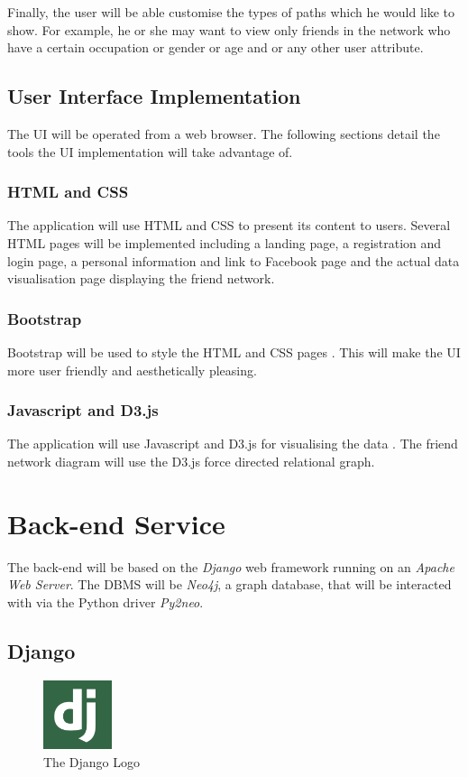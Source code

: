 \documentclass[10pt,onecolumn]{article}
\begin{document}
Finally, the user will be able customise the types of paths which he would like to show. For example, he or she may want to view only friends in the network who have a certain occupation or gender or age and or any other user attribute.

\subsection{User Interface Implementation}
The UI will be operated from a web browser. The following sections detail the tools the UI implementation will take advantage of.

\subsubsection{HTML and CSS}
The application will use HTML and CSS to present its content to users. Several HTML pages will be implemented including a landing page, a registration and login page, a personal information and link to Facebook page and the actual data visualisation page displaying the friend network.

\subsubsection{Bootstrap}
Bootstrap will be used to style the HTML and CSS pages \cite{Bootstrap}. This will make the UI more user friendly and aesthetically pleasing.

\subsubsection{Javascript and D3.js}
The application will use Javascript and D3.js for visualising the data \cite{D3}. The friend network diagram will use the D3.js force directed relational graph.

\section{Back-end Service}

The back-end will be based on the \emph{Django} web framework running on an \emph{Apache Web Server}. The DBMS will be \emph{Neo4j}, a graph database, that will be interacted with via the Python driver \emph{Py2neo}. 
\subsection{Django}
\begin{figure}
  \begin{center}
    \includegraphics[width=0.18\textwidth]{django}
  \end{center}
  \caption{The Django Logo}
\end{figure}
\end{document}
